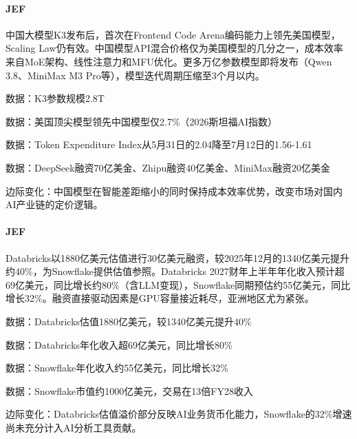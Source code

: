 \documentclass[11pt]{ctexart}
\begin{document}
\paragraph{JEF} 中国大模型K3发布后，首次在Frontend Code Arena编码能力上领先美国模型，Scaling Law仍有效。中国模型API混合价格仅为美国模型的几分之一，成本效率来自MoE架构、线性注意力和MFU优化。更多万亿参数模型即将发布（Qwen 3.8、MiniMax M3 Pro等），模型迭代周期压缩至3个月以内。
{\small\color{refgray}数据：K3参数规模2.8T\par}
{\small\color{refgray}数据：美国顶尖模型领先中国模型仅2.7\%（2026斯坦福AI指数）\par}
{\small\color{refgray}数据：Token Expenditure Index从5月31日的2.04降至7月12日的1.56-1.61\par}
{\small\color{refgray}数据：DeepSeek融资70亿美金、Zhipu融资40亿美金、MiniMax融资20亿美金\par}
{\small\color{refgray}边际变化：中国模型在智能差距缩小的同时保持成本效率优势，改变市场对国内AI产业链的定价逻辑。\par}
\paragraph{JEF} Databricks以1880亿美元估值进行30亿美元融资，较2025年12月的1340亿美元提升约40\%，为Snowflake提供估值参照。Databricks 2027财年上半年年化收入预计超69亿美元，同比增长约80\%（含LLM变现），Snowflake同期预估约55亿美元，同比增长32\%。融资直接驱动因素是GPU容量接近耗尽，亚洲地区尤为紧张。
{\small\color{refgray}数据：Databricks估值1880亿美元，较1340亿美元提升40\%\par}
{\small\color{refgray}数据：Databricks年化收入超69亿美元，同比增长80\%\par}
{\small\color{refgray}数据：Snowflake年化收入约55亿美元，同比增长32\%\par}
{\small\color{refgray}数据：Snowflake市值约1000亿美元，交易在13倍FY28收入\par}
{\small\color{refgray}边际变化：Databricks估值溢价部分反映AI业务货币化能力，Snowflake的32\%增速尚未充分计入AI分析工具贡献。\par}
\end{document}
